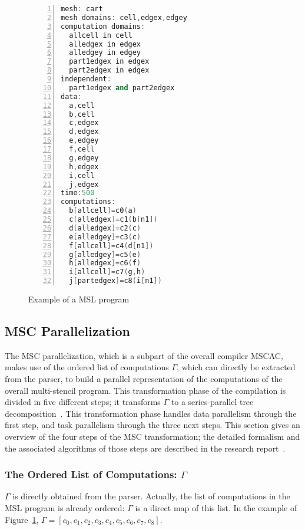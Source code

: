 \begin{figure}[t]
\begin{lstlisting}[basicstyle=\small,mathescape,frame=single,language=C++,numbers=left]
mesh: cart
mesh domains: cell,edgex,edgey
computation domains:
  allcell in cell
  alledgex in edgex
  alledgey in edgey
  part1edgex in edgex
  part2edgex in edgex
independent:
  part1edgex and part2edgex
data:
  a,cell
  b,cell
  c,edgex
  d,edgex
  e,edgey
  f,cell
  g,edgey
  h,edgex
  i,cell
  j,edgex
time:500
computations:
  b[allcell]=c0(a)
  c[alledgex]=c1(b[n1])
  d[alledgex]=c2(c)
  e[alledgey]=c3(c)
  f[allcell]=c4(d[n1])
  g[alledgey]=c5(e)
  h[alledgex]=c6(f)
  i[allcell]=c7(g,h)
  j[partedgex]=c8(i[n1])
\end{lstlisting}
\caption{Example of a MSL program}
\label{fig:mslex}
\end{figure}

\subsection{MSC Parallelization}
The MSC parallelization, which is a subpart of the overall compiler MSCAC, makes use of the ordered list of computations $\Gamma$, which can directly be extracted from the parser, to build a parallel representation of the computations of the overall multi-stencil program. This transformation phase of the compilation is divided in five different steps; it transforms $\Gamma$ to a series-parallel tree decomposition~\cite{Valdes:1979:RSP:800135.804393}. This transformation phase handles data parallelism through the first step, and task parallelism through the three next steps. This section gives an overview of the four steps of the MSC transformation; the detailed formalism and the associated algorithms of those steps are described in the research report~\cite{????}.

\subsubsection*{The Ordered List of Computations: $\Gamma$}
$\Gamma$ is directly obtained from the parser. Actually, the list of computations in the MSL program is already ordered: $\Gamma$ is a direct map of this list. In the example of Figure~\ref{fig:mslex}, $\Gamma = [c_0,c_1,c_2,c_3,c_4,c_5,c_6,c_7,c_8]$.

